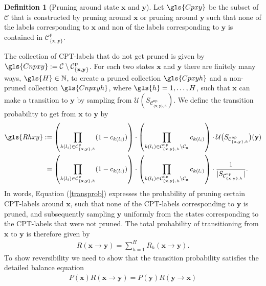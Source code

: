 \documentclass[a4paper, twoside, 11pt]{report}
\newcommand{\bfx}{{\mathbf{x}}}
\newcommand{\C}{{\mathcal C}}
\newcommand{\U}{{\mathcal{U}}}
\theoremstyle{plain}
\theoremstyle{definition}
\newtheorem{definition}[thm]{Definition}
\theoremstyle{remark}
\newcommand{\bfy}{{\mathbf{y}}}
\def\N{{\mathbb N}}
\begin{document}
\begin{definition}[Pruning around state $\bfx$ and $\bfy$]
Let $\gls{Cpxy}$ be the subset of $\mathcal{C}$ that is constructed by pruning around $\mathbf{x}$ or pruning around $\mathbf{y}$ such that none of the labels corresponding to $\mathbf{x}$ and non of the labels corresponding to $\mathbf{y}$ is contained in $\mathcal{C}_{\{\mathbf{x}, \mathbf{y}\}}^{\text{p}}$.
\end{definition}
The collection of CPT-labels that do not get pruned is given by $\gls{Cnpxy} := \C \setminus \mathcal{C}_{\{\mathbf{x}, \mathbf{y}\}}^{\text{p}}$. For each two states $\bfx$ and $\bfy$ there are finitely many ways, $\gls{H} \in \N$, to create a pruned collection $\gls{Cpxyh}$ and a non-pruned collection $\gls{Cnpxyh}$, where $\gls{h} =1,\ldots, H$, such that $\bfx$ can make a transition to $\bfy$ by sampling from $\U(S_{\C_{\{\bfx, \bfy\},h}^{\text{np}}})$. We define the transition probability to get from $\bfx$ to $\bfy$ by
\begin{align}\label{transprob}
\gls{Rhxy} &:= \left(\prod_{k(l_i) \in \C_{\{\bfx, \bfy\},h}^{\text{p}} } (1-c_{k(l_i)}) \right) \cdot \left( \prod_{k(l_i) \in \C_{\{\bfx, \bfy\},h}^{\text{np}} \setminus \mathcal{C}_{\mathbf{x}}  } c_{k(l_i)}   \right) \cdot \mathcal{U} \big( S_{\C_{\{\bfx, \bfy\},h}^{\text{np}}} \big)(\mathbf{y}) \\ \nonumber
&\;=\left(\prod_{k(l_i) \in \C_{\{\bfx, \bfy\},h}^{\text{p}} } (1-c_{k(l_i)}) \right)\cdot \left( \prod_{k(l_i) \in \C_{\{\bfx, \bfy\},h}^{\text{np}} \setminus \mathcal{C}_{\mathbf{x}}  } c_{k(l_i)}   \right)  \nonumber \cdot \frac{1}{|S_{\C_{\{\bfx, \bfy\},h}^{\text{np}}}|}.
\end{align}
In words, Equation (\ref{transprob}) expresses the probability of pruning certain CPT-labels around $\bfx$, such that none of the CPT-labels corresponding to $\bfy$ is pruned, and subsequently sampling $\bfy$ uniformly from the states corresponding to the CPT-labels that were not pruned. The total probability of transitioning from $\bfx$ to $\bfy$ is therefore given by
\begin{align} \label{total}
{R}(\mathbf{x} \to \mathbf{y}) = \sum_{h=1}^{H} {R}_h (\mathbf{x} \to \mathbf{y}).
\end{align}
To show reversibility we need to show that the transition probability satisfies the detailed balance equation
\begin{align*}
P(\mathbf{x}) R(\mathbf{x} \to \mathbf{y}) = P(\mathbf{y}) R(\mathbf{y} \to \mathbf{x}) 
\end{align*}
\end{document}
